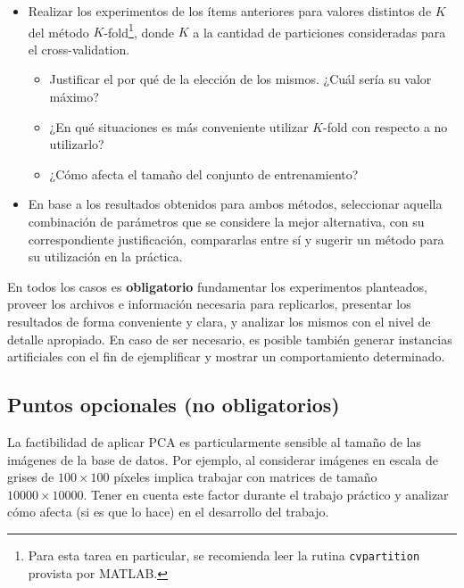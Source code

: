\documentclass[11pt, a4paper]{article}
\newcommand{\kkfold}{K}
\begin{document}
\begin{itemize}
  \item Realizar los experimentos de los ítems anteriores para valores distintos de $\kkfold$ del método $\kkfold$-fold\footnote{Para esta tarea en particular, se recomienda leer la rutina \texttt{cvpartition} provista por MATLAB.}, donde  $\kkfold$ a la cantidad de particiones consideradas para el cross-validation.
  \begin{itemize}
    \item Justificar el por qué de la elección de los mismos. ¿Cuál sería su valor máximo?
    \item ¿En qué situaciones es más conveniente utilizar $\kkfold$-fold con respecto a no utilizarlo? 
    \item ¿Cómo afecta el tamaño del conjunto de entrenamiento?
  \end{itemize}   
  \item En base a los resultados obtenidos para ambos métodos, seleccionar aquella combinación de parámetros que se considere la mejor alternativa, con su correspondiente justificación, compararlas entre sí y sugerir un método para su utilización en la práctica.
\end{itemize}


En todos los casos es \textbf{obligatorio} fundamentar los experimentos planteados, proveer los archivos e información necesaria para replicarlos, presentar los resultados de forma conveniente y clara, y analizar los mismos con el nivel de detalle apropiado. En caso de ser necesario, es posible también generar instancias artificiales con el fin de ejemplificar y mostrar un comportamiento determinado.


\subsection*{Puntos opcionales (no obligatorios)}

La factibilidad de aplicar PCA es particularmente sensible al tamaño de las imágenes de la base de datos. Por ejemplo, al considerar imágenes en escala de grises de $100 \times 100$ píxeles implica trabajar con matrices de tamaño $10000 \times 10000$. 
Tener en cuenta este factor durante el trabajo práctico y analizar cómo afecta (si es que lo hace) en el desarrollo del trabajo. 

\end{document}
